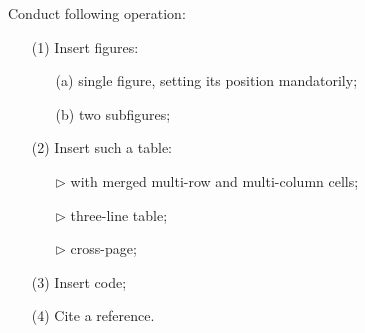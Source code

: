 \documentclass[en, twoside]{assignment}
\begin{document}
\begin{pf}
\begin{itemize}
        \end{itemize}
    \end{pf}

    \clearpage

    \begin{prob}
        Conduct following operation:
        \begin{itemize}
            \item[(1)] Insert figures:
            \begin{itemize}
                \item[(a)] single figure, setting its position mandatorily;
                \item[(b)] two subfigures;
            \end{itemize}
            \item[(2)] Insert such a table:
            \begin{itemize}
                \item[$\triangleright$] with merged multi-row and multi-column cells;
                \item[$\triangleright$] three-line table;
                \item[$\triangleright$] cross-page;
            \end{itemize}
            \item[(3)] Insert code;
            \item[(4)] Cite a reference.
        \end{itemize}
    \end{prob}
\end{document}
